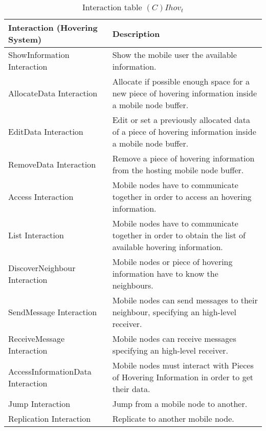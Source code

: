 \begin{table}[H]
	\centering
	\begin{tabular}{|p{4cm}|p{8cm}|}
			\hline
			\textbf{Interaction (Hovering System)} & \textbf{Description} \\
			\hline
			ShowInformation Interaction & Show the mobile user the available information. \\
			\hline
      AllocateData Interaction & Allocate if possible enough space for a new
      piece of hovering information inside a mobile node buffer. \\
			\hline
      EditData Interaction & Edit or set a previously allocated data of a piece
      of hovering information inside a mobile node buffer. \\
			\hline
			RemoveData Interaction & Remove a piece of hovering information from the
			hosting mobile node buffer. \\
			\hline
			Access Interaction & Mobile nodes have to communicate together in order to
			access an hovering information. \\
			\hline
			List Interaction & Mobile nodes have to communicate together in order to
			obtain the list of available hovering information. \\
			\hline
			DiscoverNeighbour Interaction & Mobile nodes or piece of hovering
			information have to know the neighbours. \\
			\hline
      SendMessage Interaction & Mobile nodes can send messages to their
      neighbour, specifying an high-level receiver. \\
			\hline
      ReceiveMessage Interaction & Mobile nodes can receive messages specifying
      an high-level receiver. \\
			\hline
			\hline
			AccessInformationData Interaction & Mobile nodes must interact with Pieces
			of Hovering Information in order to get their data. \\
			\hline
			Jump Interaction & Jump from a mobile node to another. \\
			\hline
			Replication Interaction & Replicate to another mobile node. \\
			\hline
		\end{tabular}
	\caption{Interaction table $(C)Ihov_t$}
	\label{tab:cihovt}
\end{table}

